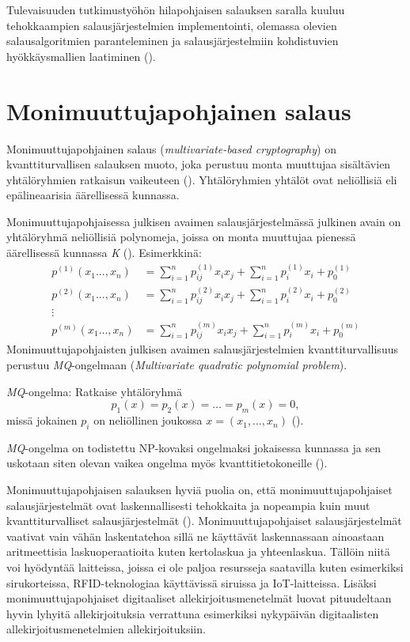 Tulevaisuuden tutkimustyöhön hilapohjaisen salauksen saralla kuuluu tehokkaampien salausjärjestelmien implementointi, olemassa olevien salausalgoritmien paranteleminen ja salausjärjestelmiin kohdistuvien hyökkäysmallien laatiminen (\cite{8275352}).

\section{Monimuuttujapohjainen salaus}
Monimuuttujapohjainen salaus (\emph{multivariate-based cryptography}) on kvanttiturvallisen salauksen muoto, joka perustuu monta muuttujaa sisältävien yhtälöryhmien ratkaisun vaikeuteen (\cite{Ding2009}). Yhtälöryhmien yhtälöt ovat neliöllisiä eli epälineaarisia äärellisessä kunnassa.

Monimuuttujapohjaisessa julkisen avaimen salausjärjestelmässä julkinen avain on yhtälöryhmä neliöllisiä polynomeja, joissa on monta muuttujaa pienessä äärellisessä kunnassa \emph{K} (\cite{8012305}). Esimerkkinä: 
    \begin{align*}
        p^{(1)}(x_{1}...,x_{n}) &= \sum_{i=1}^{n} p_{ij}^{(1)}x_{i}x_ {j}+\sum_{i=1}^{n}p_ {i}^{(1)}x_{i}+p_ {0}^{(1)} \\
        p^{(2)}(x_{1}...,x_{n}) &= \sum_{i=1}^{n} p_{ij}^{(2)}x_{i}x_ {j}+\sum_{i=1}^{n}p_ {i}^{(2)}x_{i}+p_ {0}^{(2)} \\
        \vdots \\
        p^{(m)}(x_{1}...,x_{n}) &= \sum_{i=1}^{n} p_{ij}^{(m)}x_{i}x_ {j}+\sum_{i=1}^{n}p_ {i}^{(m)}x_{i}+p_ {0}^{(m)}
    \end{align*}
Monimuuttujapohjaisten julkisen avaimen salausjärjestelmien kvanttiturvallisuus perustuu \emph{MQ}-ongelmaan (\emph{Multivariate quadratic polynomial problem}).

\emph{MQ}-ongelma: Ratkaise yhtälöryhmä \[p_{1}(x) = p_{2}(x) = \ldots = p_ {m}(x) = 0,\] missä jokainen $p_{i}$ on neliöllinen joukossa $x = (x_{1}, \ldots, x_{n})$ (\cite{Ding2009}).

\emph{MQ}-ongelma on todistettu NP-kovaksi ongelmaksi jokaisessa kunnassa ja sen uskotaan siten olevan vaikea ongelma myös kvanttitietokoneille (\cite{8012305}).

Monimuuttujapohjaisen salauksen hyviä puolia on, että monimuuttujapohjaiset salausjärjestelmät ovat laskennallisesti tehokkaita ja nopeampia kuin muut kvanttiturvalliset salausjärjestelmät  (\cite{8012305}). Monimuuttujapohjaiset salausjärjestelmät vaativat vain vähän laskentatehoa sillä ne käyttävät laskennassaan ainoastaan aritmeettisia laskuoperaatioita kuten kertolaskua ja yhteenlaskua. Tällöin niitä voi hyödyntää laitteissa, joissa ei ole paljoa resursseja saatavilla kuten esimerkiksi sirukorteissa, RFID-teknologiaa käyttävissä siruissa ja IoT-laitteissa. Lisäksi monimuuttujapohjaiset digitaaliset allekirjoitusmenetelmät luovat pituudeltaan hyvin lyhyitä allekirjoituksia verrattuna esimerkiksi nykypäivän digitaalisten allekirjoitusmenetelmien allekirjoituksiin.

